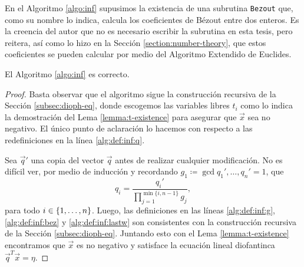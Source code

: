 En el Algoritmo \ref{algo:inf} supusimos la existencia de una subrutina \texttt{Bezout} que, como su
nombre lo indica, calcula los coeficientes de Bézout entre dos enteros. Es la creencia del autor
que no es necesario escribir la subrutina en esta tesis, pero reitera, así como lo hizo en la Sección
\ref{section:number-theory}, que estos coeficientes se pueden calcular por medio del Algoritmo
Extendido de Euclides.

\begin{lemma}
	\label{lemma:alg:inf:correct}
	El Algoritmo \ref{algo:inf} es correcto.
\end{lemma}
\begin{proof}
	Basta observar que el algoritmo sigue la construcción recursiva de la Sección
	\ref{subsec:dioph-eq}, donde escogemos las variables libres $t_i$ como lo indica la demostración
	del Lema \ref{lemma:t-existence} para asegurar que $\vec{x}$ sea no negativo. El único punto de
	aclaración lo hacemos con respecto a las redefiniciones en la línea \eqref{alg:def:inf:q}.

	Sea $\vec{q}'$ una copia del vector $\vec{q}$ antes de realizar cualquier modificación. No es
	difícil ver, por medio de inducción y recordando $g_1 \coloneq \gcd{q_1', \ldots, q_n'} = 1$,
	que
	\begin{equation*}
		q_i = \frac{q_i'}{\prod_{j=1}^{\min\lbrace i, n - 1\rbrace}g_j},
	\end{equation*}
	para todo $i \in \lbrace 1, \ldots, n \rbrace$. Luego, las definiciones en las líneas
	\eqref{alg:def:inf:g}, \eqref{alg:def:inf:bez} y \eqref{alg:def:inf:lastw} son consistentes con
	la construcción recursiva de la Sección \ref{subsec:dioph-eq}. Juntando esto con el Lema
	\ref{lemma:t-existence} encontramos que $\vec{x}$ es no negativo y satisface la ecuación lineal
	diofantinca $\vec{q}^T\vec{x} = \eta$.




\end{proof}
